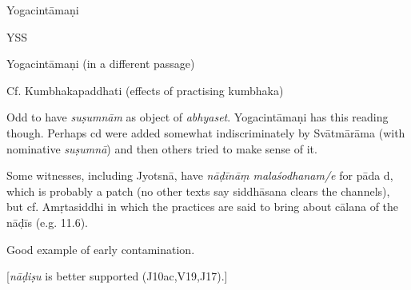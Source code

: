 \begin{ekdosis}
\begin{testimonia}[hp01_039]
Yogacintāmaṇi

\begin{versinnote}
\end{versinnote}

YSS

\begin{versinnote}
\end{versinnote}

Yogacintāmaṇi (in a different passage)
​​
\begin{versinnote}
\end{versinnote}

Cf. Kumbhakapaddhati (effects of practising kumbhaka)

\begin{versinnote}
\end{versinnote}

\end{testimonia}

\begin{philcomm}[hp01_039]
Odd to have \emph{suṣumnām} as object of \emph{abhyaset}. Yogacintāmaṇi has this reading though. Perhaps cd were added somewhat indiscriminately by Svātmārāma (with nominative \emph{suṣumnā}) and then others tried to make sense of it.

Some witnesses, including Jyotsnā, have \emph{nāḍīnāṃ malaśodhanam/e} for pāda d, which is probably a patch (no other texts say siddhāsana clears the channels), but cf. Amṛtasiddhi in which the practices are said to bring about cālana of the nāḍīs (e.g. 11.6).

Good example of early contamination.

[\emph{nāḍiṣu} is better supported (J10ac,V19,J17).]
\end{philcomm}


\end{ekdosis}
